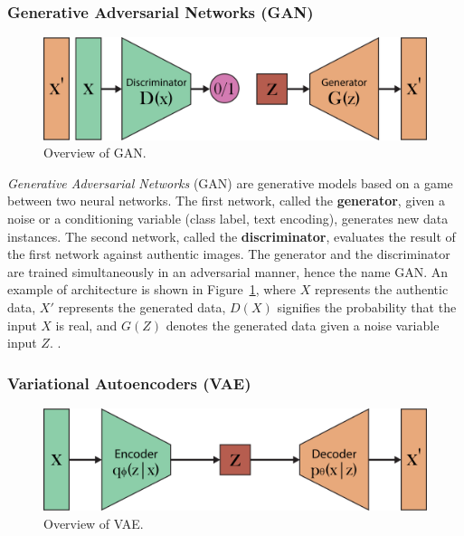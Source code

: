 \documentclass[preprint]{elsarticle}
\begin{document}
\subsubsection{Generative Adversarial Networks (GAN)}\label{sec:gan}

\begin{figure}[b]
	\centering
    \includegraphics[scale=0.8]{img/svg/GAN.png}
	\caption{Overview of GAN.}\label{fig:gan}
\end{figure}

\emph{Generative Adversarial Networks} (GAN) \cite{goodfellow2014generative} are generative models based on a game between two neural networks. 
The first network, called the \textbf{generator}, given a noise or a conditioning variable (class label, text encoding), generates new data instances. 
The second network, called the \textbf{discriminator}, evaluates the result of the first network against authentic images.
The generator and the discriminator are trained simultaneously in an adversarial manner, hence the name GAN. An example of architecture is shown in Figure~\ref{fig:gan}, where $X$ represents the authentic data, $X'$ represents the generated data, $D(X)$ signifies the probability that the input $X$ is real, and $G(Z)$ denotes the generated data given a noise variable input $Z$.
\cite{weng2019gan}.

\subsubsection{Variational Autoencoders (VAE)} \label{sec:vae}

\begin{figure}[t]
	\centering
    \includegraphics[scale=0.8]{img/svg/VAE.png}
    \caption{Overview of VAE.}\label{fig:vae}
\end{figure}
\end{document}
